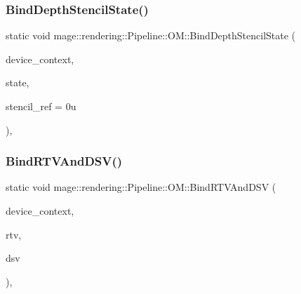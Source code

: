 \hypertarget{structmage_1_1rendering_1_1_pipeline_1_1_o_m_ab7f66158cb79c35059a71a8772c39adb}{}\label{structmage_1_1rendering_1_1_pipeline_1_1_o_m_ab7f66158cb79c35059a71a8772c39adb} 
\subsubsection{\texorpdfstring{Bind\+Depth\+Stencil\+State()}{BindDepthStencilState()}}
{\footnotesize\ttfamily static void mage\+::rendering\+::\+Pipeline\+::\+O\+M\+::\+Bind\+Depth\+Stencil\+State (\begin{DoxyParamCaption}\item[{I\+D3\+D11\+Device\+Context \&}]{device\+\_\+context,  }\item[{I\+D3\+D11\+Depth\+Stencil\+State $\ast$}]{state,  }\item[{\hyperlink{namespacemage_a41c104c036fba3756a74e19f793eeaa1}{U32}}]{stencil\+\_\+ref = {\ttfamily 0u} }\end{DoxyParamCaption})\hspace{0.3cm}{\ttfamily [static]}, {\ttfamily [noexcept]}}

\hypertarget{structmage_1_1rendering_1_1_pipeline_1_1_o_m_ae0d426f3b3972be80c1b6700266d3c65}{}\label{structmage_1_1rendering_1_1_pipeline_1_1_o_m_ae0d426f3b3972be80c1b6700266d3c65} 
\subsubsection{\texorpdfstring{Bind\+R\+T\+V\+And\+D\+S\+V()}{BindRTVAndDSV()}}
{\footnotesize\ttfamily static void mage\+::rendering\+::\+Pipeline\+::\+O\+M\+::\+Bind\+R\+T\+V\+And\+D\+SV (\begin{DoxyParamCaption}\item[{I\+D3\+D11\+Device\+Context \&}]{device\+\_\+context,  }\item[{I\+D3\+D11\+Render\+Target\+View $\ast$}]{rtv,  }\item[{I\+D3\+D11\+Depth\+Stencil\+View $\ast$}]{dsv }\end{DoxyParamCaption})\hspace{0.3cm}{\ttfamily [static]}, {\ttfamily [noexcept]}}

